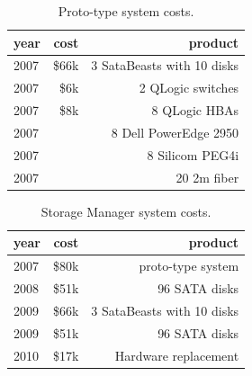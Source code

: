 \begin{table}[!ht]
\begin{center}
\begin{tabular}{l|r|r}
year & cost    & product \\\hline\hline
2007 & \$66k   & 3 SataBeasts with 10 disks  \\\hline
2007 & \$6k    & 2 QLogic switches  \\\hline
2007 & \$8k    & 8 QLogic HBAs \\\hline
2007 &         & 8 Dell PowerEdge 2950 \\\hline
2007 &         & 8 Silicom PEG4i \\\hline
2007 &         & 20 2m fiber \\\hline\hline
\end{tabular}
\caption{Proto-type system costs.}
\label{tab:proto}
\end{center}
\end{table}

\begin{table}[!ht]
\begin{center}
\begin{tabular}{l|r|r}
year & cost    & product \\\hline\hline
2007 & \$80k   & proto-type system \\\hline
2008 & \$51k   & 96 SATA disks  \\\hline
2009 & \$66k   & 3 SataBeasts with 10 disks  \\\hline
2009 & \$51k   & 96 SATA disks  \\\hline
2010 & \$17k   & Hardware replacement  \\

\end{tabular}
\caption{Storage Manager system costs.}
\label{tab:costs}
\end{center}
\end{table}
